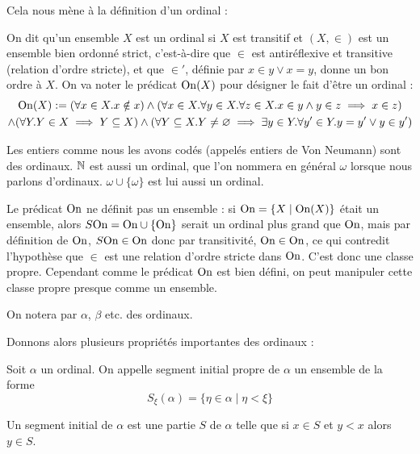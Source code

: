 Cela nous mène à la définition d'un ordinal :

\begin{defi}[Ordinal]
    On dit qu'un ensemble $X$ est un ordinal si $X$ est transitif et $(X,\in)$ est un ensemble bien ordonné strict, c'est-à-dire que $\in$ est antiréflexive et transitive (relation d'ordre stricte), et que $\in'$, définie par $x\in y \lor x=y$, donne un bon ordre à $X$. On va noter le prédicat $\mathrm{On}(X)$ pour désigner le fait d'être un ordinal : \begin{multline*}\mathrm{On}(X) := (\forall x\in X.x\notin x) \land (\forall x\in X.\forall y\in X.\forall z\in X. x\in y\land y\in z \implies x\in z) \\\land (\forall Y.Y\in X \implies Y\subseteq X)\land (\forall Y\subseteq X. Y\neq \varnothing \implies \exists y\in Y. \forall y'\in Y. y=y' \lor y\in y')\end{multline*} 
\end{defi}

\begin{expl}
    Les entiers comme nous les avons codés (appelés entiers de Von Neumann) sont des ordinaux. $\mathbb{N}$ est aussi un ordinal, que l'on nommera en général $\omega$ lorsque nous parlons d'ordinaux. $\omega\cup\{\omega\}$ est lui aussi un ordinal.
\end{expl}

\begin{ctexpl}
    Le prédicat $\mathrm{On}$ ne définit pas un ensemble : si $\mathrm{On} = \{X\mid \mathrm{On}(X)\}$ était un ensemble, alors $S\mathrm{On} = \mathrm{On}\cup\{\mathrm{On}\}$ serait un ordinal plus grand que $\mathrm{On}$, mais par définition de $\mathrm{On}$, $S\mathrm{On}\in\mathrm{On}$ donc par transitivité, $\mathrm{On}\in\mathrm{On}$, ce qui contredit l'hypothèse que $\in$ est une relation d'ordre stricte dans $\mathrm{On}$. C'est donc une classe propre. Cependant comme le prédicat $\mathrm{On}$ est bien défini, on peut manipuler cette classe propre presque comme un ensemble.
\end{ctexpl}

On notera par $\alpha$, $\beta$ etc. des ordinaux.

Donnons alors plusieurs propriétés importantes des ordinaux :

\begin{defi}
    Soit $\alpha$ un ordinal. On appelle segment initial propre de $\alpha$ un ensemble de la forme $$S_\xi(\alpha) = \{ \eta\in \alpha\mid \eta < \xi\}$$

    Un segment initial de $\alpha$ est une partie $S$ de $\alpha$ telle que si $x\in S$ et $y < x$ alors $y\in S$.
\end{defi}

